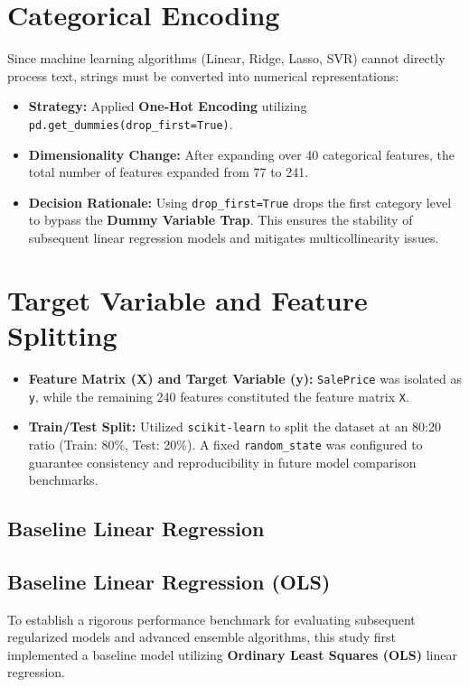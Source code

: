 \documentclass[11pt]{article}
\begin{document}
\section{Categorical Encoding}
Since machine learning algorithms (Linear, Ridge, Lasso, SVR) cannot directly process text, strings must be converted into numerical representations:
\begin{itemize}[leftmargin=*]
    \item \textbf{Strategy:} Applied \textbf{One-Hot Encoding} utilizing \texttt{pd.get\_dummies(drop\_first=True)}.
    \item \textbf{Dimensionality Change:} After expanding over 40 categorical features, the total number of features expanded from 77 to 241.
    \item \textbf{Decision Rationale:} Using \texttt{drop\_first=True} drops the first category level to bypass the \textbf{Dummy Variable Trap}. This ensures the stability of subsequent linear regression models and mitigates multicollinearity issues.
\end{itemize}

\section{Target Variable and Feature Splitting}
\begin{itemize}[leftmargin=*]
    \item \textbf{Feature Matrix (X) and Target Variable (y):} \texttt{SalePrice} was isolated as \texttt{y}, while the remaining 240 features constituted the feature matrix \texttt{X}.
    \item \textbf{Train/Test Split:} Utilized \texttt{scikit-learn} to split the dataset at an 80:20 ratio (Train: 80\%, Test: 20\%). A fixed \texttt{random\_state} was configured to guarantee consistency and reproducibility in future model comparison benchmarks.
\end{itemize}

\subsection{Baseline Linear Regression}
\subsection{Baseline Linear Regression (OLS)}

To establish a rigorous performance benchmark for evaluating subsequent regularized models and advanced ensemble algorithms, this study first implemented a baseline model utilizing \textbf{Ordinary Least Squares (OLS)} linear regression.
\end{document}
